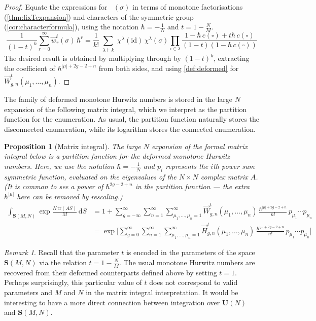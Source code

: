 \documentclass[a4paper]{article}
\theoremstyle{plain}
\newtheorem{proposition}[theorem]{Proposition}
\numberwithin{theorem}{section}
\theoremstyle{definition}
\theoremstyle{remark}
\newtheorem{remark}[theorem]{Remark}
\newcommand{\dd}{\mathrm{d}}
\newcommand{\h}{\hbar}
\newcommand{\UM}{\mathbf{U}}			%
\newcommand{\SM}{\mathbf{S}}			%
\newcommand{\sm}{S}					%
\DeclareMathOperator{\SW}{Wg^{\SM}}		%
\newcommand{\dhn}[2]{\vec{w}^{t}_{#1}(#2)}
\newcommand{\dHN}[3]{\vec{W}^t_{#1,#2}(#3)}
\newcommand{\HN}[3]{\vec{H}^t_{#1,#2}(#3)}
\begin{document}
\begin{proof}
Equate the expressions for $\SW(\sigma)$ in terms of monotone factorisations (\cref{thm:fixTexpansion}) and characters of the symmetric group (\cref{cor:characterformula}), using the notation $\h = -\frac{1}{N}$ and $t = 1 - \frac{N}{M}$.
\[
\frac{1}{(1-t)^k} \sum_{r=0}^\infty \dhn{r}{\sigma} \, \h^r = \frac{1}{k!} \sum_{\substack{\lambda\vdash k}} \chi^\lambda(\mathrm{id}) \, \chi^\lambda(\sigma) \prod_{\square \in \lambda} \frac{1 - \h \, c(\square) + t \h \, c(\square)}{(1-t) (1 - \h \, c(\square))}
\]
The desired result is obtained by multiplying through by $(1-t)^k$, extracting the coefficient of $\h^{|\mu|+2g-2+n}$ from both sides, and using \cref{def:deformed} for $\dHN{g}{n}{\mu_1, \ldots, \mu_n}$.
\end{proof}


The family of deformed monotone Hurwitz numbers is stored in the large $N$ expansion of the following matrix integral, which we interpret as the partition function for the enumeration. As usual, the partition function naturally stores the disconnected enumeration, while its logarithm stores the connected enumeration.


\begin{proposition} [Matrix integral] \label{prop:integral}
The large $N$ expansion of the formal matrix integral below is a partition function for the deformed monotone Hurwitz numbers. Here, we use the notation $\h = -\frac{1}{N}$ and $p_i$ represents the $i$th power sum symmetric function, evaluated on the eigenvalues of the $N \times N$ complex matrix $A$. (It is common to see a power of $\h^{2g-2+n}$ in the partition function --- the extra $\h^{|\mu|}$ here can be removed by rescaling.)
\begin{align*}
\int_{\SM(M,N)} \exp \frac{N \, \mathrm{tr}(A\sm)}{M} \, \dd \sm &= 1 + \sum_{g=-\infty}^{\infty} \sum_{n=1}^\infty \sum_{\mu_1, \ldots, \mu_n = 1}^\infty \dHN{g}{n}{\mu_1, \ldots, \mu_n} \, \frac{\h^{|\mu|+2g-2+n}}{n!} \, p_{\mu_1} \cdots p_{\mu_n} \\
&= \exp \Bigg[ \sum_{g=0}^{\infty} \sum_{n=1}^\infty \sum_{\mu_1, \ldots, \mu_n = 1}^\infty \HN{g}{n}{\mu_1, \ldots, \mu_n} \, \frac{\h^{|\mu|+2g-2+n}}{n!} \, p_{\mu_1} \cdots p_{\mu_n} \Bigg]
\end{align*}
\end{proposition}


\begin{remark}
Recall that the parameter $t$ is encoded in the parameters of the space $\SM(M,N)$ via the relation $t = 1 - \frac{N}{M}$. The usual monotone Hurwitz numbers are recovered from their deformed counterparts defined above by setting $t = 1$. Perhaps surprisingly, this particular value of $t$ does not correspond to valid parameters and $M$ and $N$ in the matrix integral interpretation. It would be interesting to have a more direct connection between integration over $\UM(N)$ and $\SM(M,N)$.
\end{remark}
\end{document}
